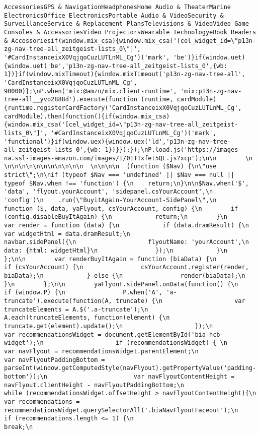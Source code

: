 \documentclass[
]{article}
\begin{document}
\begin{verbatim}
AccessoriesGPS & NavigationHeadphonesHome Audio & TheaterMarine ElectronicsOffice ElectronicsPortable Audio & VideoSecurity & SurveillanceService & Replacement PlansTelevisions & VideoVideo Game Consoles & AccessoriesVideo ProjectorsWearable TechnologyeBook Readers & Accessoriesif(window.mix_csa){window.mix_csa('[cel_widget_id=\"p13n-zg-nav-tree-all_zeitgeist-lists_0\"]', '#CardInstanceixX0VqjqoCuzLUTLnML_Cg')('mark', 'be')}if(window.uet){window.uet('be','p13n-zg-nav-tree-all_zeitgeist-lists_0',{wb: 1})}if(window.mixTimeout){window.mixTimeout('p13n-zg-nav-tree-all', 'CardInstanceixX0VqjqoCuzLUTLnML_Cg', 90000)};\nP.when('mix:@amzn/mix.client-runtime', 'mix:p13n-zg-nav-tree-all__yvo2888d').execute(function (runtime, cardModule) {runtime.registerCardFactory('CardInstanceixX0VqjqoCuzLUTLnML_Cg', cardModule).then(function(){if(window.mix_csa){window.mix_csa('[cel_widget_id=\"p13n-zg-nav-tree-all_zeitgeist-lists_0\"]', '#CardInstanceixX0VqjqoCuzLUTLnML_Cg')('mark', 'functional')}if(window.uex){window.uex('ld','p13n-zg-nav-tree-all_zeitgeist-lists_0',{wb: 1})}});});\nP.load.js('https://images-na.ssl-images-amazon.com/images/I/01T1xfet5QL.js?xcp');\n\n        \n    \n\n\n\n\n\n\n\n\n\n\n  \n\n\n\n  (function ($Nav) {\n\"use strict\";\n\nif (typeof $Nav === 'undefined' || $Nav === null || typeof $Nav.when !== 'function') {\n    return;\n}\n\n$Nav.when('$', 'data', 'flyout.yourAccount', 'sidepanel.csYourAccount',\n          'config')\n    .run(\"BuyitAgain-YourAccount-SidePanel\",\n    function ($, data, yaFlyout, csYourAccount, config) {\n        if (config.disableBuyItAgain) {\n            return;\n        }\n        var render = function (data) {\n            if (data.dramResult) {\n                var widgetHtml = data.dramResult;\n                navbar.sidePanel({\n                    flyoutName: 'yourAccount',\n                    data: {html: widgetHtml}\n                });\n            }\n        };\n\n        var renderBuyItAgain = function (biaData) {\n            if (csYourAccount) {\n                csYourAccount.register(render, biaData);\n            } else {\n                render(biaData);\n            }\n        };\n\n        yaFlyout.sidePanel.onData(function() {\n            if (window.P) {\n                P.when('A', 'a-truncate').execute(function(A, truncate) {\n                    var truncateElements = A.$('.a-truncate');\n                    A.each(truncateElements, function(element) {\n                        truncate.get(element).update();\n                    });\n                    var recommendationsWidget = document.getElementById('bia-hcb-widget');\n                    if (recommendationsWidget) { \n                        var navFlyout = recommendationsWidget.parentElement;\n                        var navFlyoutPaddingBottom = parseInt(window.getComputedStyle(navFlyout).getPropertyValue('padding-bottom'));\n                        var navFlyoutContentHeight = navFlyout.clientHeight - navFlyoutPaddingBottom;\n                        while (recommendationsWidget.offsetHeight > navFlyoutContentHeight){\n                            var recommendations = recommendationsWidget.querySelectorAll('.biaNavFlyoutFaceout');\n                            if (recommendations.length <= 1) {\n                                break;\n                
\end{verbatim}
\end{document}
